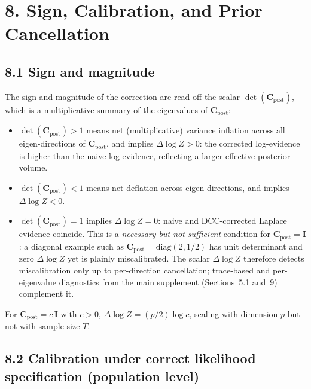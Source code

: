 \documentclass[11pt]{article}
\begin{document}
\section*{8. Sign, Calibration, and Prior Cancellation}

\subsection*{8.1 Sign and magnitude}

The sign and magnitude of the correction are read off the scalar $\det(\mathbf C_{\mathrm{post}})$,
which is a multiplicative summary of the eigenvalues of $\mathbf C_{\mathrm{post}}$:
\begin{itemize}
\item $\det(\mathbf C_{\mathrm{post}}) > 1$ means net (multiplicative) variance inflation
across all eigen-directions of $\mathbf C_{\mathrm{post}}$, and implies $\Delta\log Z > 0$:
the corrected log-evidence is higher than the naive log-evidence, reflecting a larger
effective posterior volume.
\item $\det(\mathbf C_{\mathrm{post}}) < 1$ means net deflation across eigen-directions,
and implies $\Delta\log Z < 0$.
\item $\det(\mathbf C_{\mathrm{post}}) = 1$ implies $\Delta\log Z = 0$: naive and
DCC-corrected Laplace evidence coincide. This is a \emph{necessary but not sufficient}
condition for $\mathbf C_{\mathrm{post}} = \mathbf I$: a diagonal example such as
$\mathbf C_{\mathrm{post}} = \mathrm{diag}(2, 1/2)$ has unit determinant and zero
$\Delta\log Z$ yet is plainly miscalibrated. The scalar $\Delta\log Z$ therefore detects
miscalibration only up to per-direction cancellation; trace-based and per-eigenvalue
diagnostics from the main supplement (Sections~5.1 and~9) complement it.
\end{itemize}
For $\mathbf C_{\mathrm{post}} = c\,\mathbf I$ with $c > 0$, $\Delta\log Z = (p/2)\log c$,
scaling with dimension $p$ but not with sample size $T$.

\subsection*{8.2 Calibration under correct likelihood specification (population level)}
\end{document}
